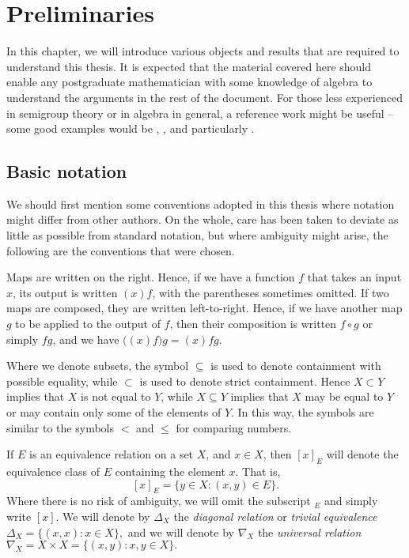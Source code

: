 \chapter{Preliminaries}
\label{chap:intro}

In this chapter, we will introduce various objects and results that are required
to understand this thesis.  It is expected that the material covered here should
enable any postgraduate mathematician with some knowledge of algebra to
understand the arguments in the rest of the document.  For those less
experienced in semigroup theory or in algebra in general, a reference work might
be useful -- some good examples would be \cite{warner}, \cite{petrich}, and
particularly \cite{howie}.

\section{Basic notation}
\label{sec:intro-notation}

We should first mention some conventions adopted in this thesis where notation
might differ from other authors.  On the whole, care has been taken to deviate
as little as possible from standard notation, but where ambiguity might arise,
the following are the conventions that were chosen.

Maps are written on the right.  Hence, if we have a function $f$ that takes an
input $x$, its output is written $(x)f$, with the parentheses sometimes omitted.
If two maps are composed, they are written left-to-right.  Hence, if we have
another map $g$ to be applied to the output of $f$, then their composition is
written $f \circ g$ or simply $fg$, and we have
$\big((x)f\big)g = (x)fg.$

Where we denote subsets, the symbol $\subseteq$ is used to denote containment
with possible equality, while $\subset$ is used to denote strict containment.
Hence $X \subset Y$ implies that $X$ is not equal to $Y$, while $X \subseteq Y$
implies that $X$ may be equal to $Y$ or may contain only some of the elements of
$Y$.  In this way, the symbols are similar to the symbols $<$ and $\leq$ for
comparing numbers.

If $E$ is an equivalence relation on a set $X$, and $x \in X$, then $[x]_E$ will
denote the equivalence class of $E$ containing the element $x$.  That is,
$$[x]_E = \{y \in X : (x,y) \in E\}.$$
Where there is no risk of ambiguity, we will omit the subscript $_E$ and simply
write $[x]$.  We will denote by $\Delta_X$ the \textit{diagonal relation} or
\textit{trivial equivalence}
$\Delta_X = \{(x,x): x \in X\},$
and we will denote by $\nabla_X$ the \textit{universal relation}
$\nabla_X = X \times X = \{(x,y): x,y \in X\}.$

